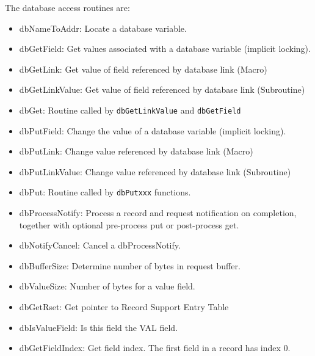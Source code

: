 The database access routines are:

\begin{itemize}

\item dbNameToAddr: Locate a database variable.

\item dbGetField: Get values associated with a database variable (implicit locking).

\item dbGetLink: Get value of field referenced by database link (Macro)

\item dbGetLinkValue: Get value of field referenced by database link (Subroutine)

\item dbGet: Routine called by \verb|dbGetLinkValue| and \verb|dbGetField|

\item dbPutField: Change the value of a database variable (implicit locking).

\item dbPutLink: Change value referenced by database link (Macro)

\item dbPutLinkValue: Change value referenced by database link (Subroutine)

\item dbPut: Routine called by \verb|dbPutxxx| functions.

\item dbProcessNotify: Process a record and request notification on completion, together with optional pre-process put or post-process get.

\item dbNotifyCancel: Cancel a dbProcessNotify.

\item dbBufferSize: Determine number of bytes in request buffer.

\item dbValueSize: Number of bytes for a value field.

\item dbGetRset: Get pointer to Record Support Entry Table

\item dbIsValueField: Is this field the VAL field.

\item dbGetFieldIndex: Get field index.
The first field in a record has index 0.


\end{itemize}
